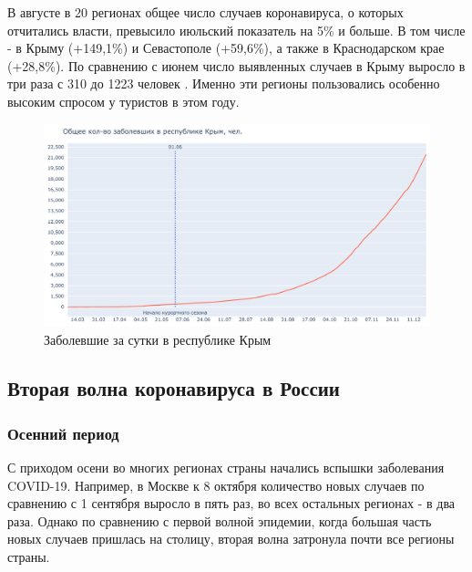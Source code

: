 \documentclass[a4paper, 12pt]{extarticle}
\begin{document}
В августе в 20 регионах общее число случаев коронавируса, о которых отчитались
власти, превысило июльский показатель на 5\% и больше. В том числе - в Крыму
(+149,1\%) и Севастополе (+59,6\%), а также в Краснодарском крае (+28,8\%). По
сравнению с июнем число выявленных случаев в Крыму выросло в три раза с 310 до
1223 человек . Именно эти регионы
пользовались особенно высоким спросом у туристов в этом году.

\begin{figure}[h]
    \centering
    \includegraphics[scale=0.5]{../plots/9republic_of_crimea.pdf}
    \caption{Заболевшие за сутки в республике Крым}
    \label{fig:total_confirmed_crimea}
\end{figure}
\newpage

\subsection{Вторая волна коронавируса в России}
\subsubsection{Осенний период}

С приходом осени во многих регионах страны начались вспышки заболевания
COVID-19. Например, в Москве к 8 октября количество новых случаев по сравнению
с 1 сентября выросло в пять раз, во всех остальных регионах - в два раза.
Однако по сравнению с первой волной эпидемии, когда большая часть новых случаев
пришлась на столицу, вторая волна затронула почти все регионы страны.
\\
\end{document}
